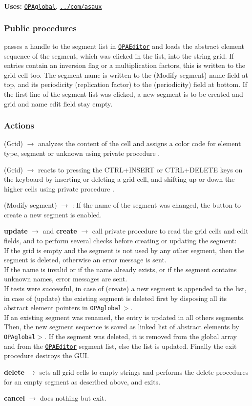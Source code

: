 \documentclass[12pt]{article}
\newcommand\code[1]{{\tt #1}}
\newcommand{\ofld}[1]{\colorbox{black!15}{{\bf #1}}}
\newcommand{\ofldx}[1]{\colorbox{black!15}{(#1)}}
\newcommand\guico[1]{{\color{blue}\code{#1}}}
\newcommand{\unico}[1]{{\color{burntorange}\code{#1}}}
\newcommand{\evcod}[2]{\ofld{#1} $\rightarrow$ \guico{#2}}
\newcommand{\evcodx}[2]{\ofldx{#1} $\rightarrow$ \guico{#2}}
\newcommand{\prcod}[2]{\opauni{#1}$>$\unico{#2}}
\newcommand{\opagui}[1]{\colorbox{blue!20}{\code{#1}}}
\newcommand{\ogui}[1]{\hyperref[#1]{\opagui{#1}}}
\newcommand{\opauni}[1]{\colorbox{orange!30}{\code{#1}}}
\newcommand{\ouni}[1]{\hyperref[#1]{\opauni{#1}}}
\newcommand{\uses}[1]{{\bf Uses: } #1}
\newcommand{\act}[1]{\subsubsection*{Actions} #1}
\newcommand{\ppro}[1]{\subsubsection*{Public procedures} #1}
\begin{document}
\uses{\ouni{OPAglobal}, \ouni{../com/asaux}}

\ppro{
\guico{Init} passes a handle to the segment list in \ogui{OPAEditor} and loads the abstract element sequence of the segment, which was clicked in the list, into the string grid. If entries contain an inversion flag or a multiplication factors, this is written to the grid cell too. The segment name is written to the \ofldx{Modify segment} name field at top, and its periodicity (replication factor) to the \ofldx{periodicity} field at bottom. If the first line of the segment list was clicked, a new segment is to be created and grid and name edit field stay empty.
}
\act{
\evcodx{Grid}{drawCell} analyzes the content of the cell and assigns a color code for element type, segment or unknown using private procedure \guico{ElemCol\_C}.

\evcodx{Grid}{gridKeyDown} reacts to pressing the CTRL+INSERT or CTRL+DELETE keys on the keyboard by inserting or deleting a grid cell, and shifting up or down the higher cells using private procedure \guico{ShiftCells}.

\evcodx{Modify segment}{EditSegNameChange}: If the name of the segment was changed, the button to create a new segment is enabled.

\evcod{update}{butokClick} and \evcod{create}{butcreClick} call private procedure \guico{SaveSeg} to read the grid cells and edit fields, and to perform several checks before creating or updating the segment:\\
If the grid is empty and the segment is not used by any other segment, then the segment is deleted, otherwise an error message is sent.\\
If the name is invalid or if the name already exists, or if the  segment contains unknown names, error messages are sent.\\
If tests were successful, in case of \ofldx{create} a new segment is appended to the list, in case of \ofldx{update} the existing segment is deleted first by disposing all its abstract element pointers in \prcod{OPAglobal}{ClearSeg}.\\
If an existing segment was renamed, the entry is updated in all others segments. Then, 
the new segment sequence is saved as linked list of abstract elements by \prcod{OPAglobal}{AppendAE}. If the segment was deleted, it is removed from the global \unico{Segm} array and from the \ogui{OPAEditor} segment list, else the list is updated. Finally the exit procedure destroys the GUI.

\evcod{delete}{butdelClick} sets all grid cells to empty strings and performs the delete procedures for an empty segment as described above, and exits.

\evcod{cancel}{butcanClick} does nothing but exit.
}
\end{document}
